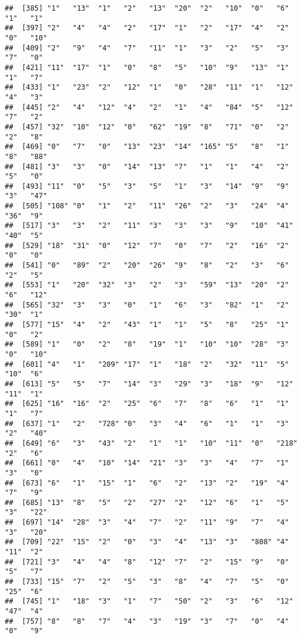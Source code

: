 \documentclass[
]{article}
\begin{document}
\begin{verbatim}
##  [385] "1"   "13"  "1"   "2"   "13"  "20"  "2"   "10"  "0"   "6"   "1"   "1"  
##  [397] "2"   "4"   "4"   "2"   "17"  "1"   "2"   "17"  "4"   "2"   "0"   "10" 
##  [409] "2"   "9"   "4"   "7"   "11"  "1"   "3"   "2"   "5"   "3"   "7"   "0"  
##  [421] "11"  "17"  "1"   "0"   "8"   "5"   "10"  "9"   "13"  "1"   "1"   "7"  
##  [433] "1"   "23"  "2"   "12"  "1"   "0"   "28"  "11"  "1"   "12"  "4"   "3"  
##  [445] "2"   "4"   "12"  "4"   "2"   "1"   "4"   "84"  "5"   "12"  "7"   "2"  
##  [457] "32"  "10"  "12"  "0"   "62"  "19"  "8"   "71"  "0"   "2"   "2"   "8"  
##  [469] "0"   "7"   "0"   "13"  "23"  "14"  "165" "5"   "8"   "1"   "8"   "88" 
##  [481] "3"   "3"   "0"   "14"  "13"  "7"   "1"   "1"   "4"   "2"   "5"   "0"  
##  [493] "11"  "0"   "5"   "3"   "5"   "1"   "3"   "14"  "9"   "9"   "3"   "47" 
##  [505] "108" "0"   "1"   "2"   "11"  "26"  "2"   "3"   "24"  "4"   "36"  "9"  
##  [517] "3"   "3"   "2"   "11"  "3"   "3"   "3"   "9"   "10"  "41"  "40"  "5"  
##  [529] "18"  "31"  "0"   "12"  "7"   "0"   "7"   "2"   "16"  "2"   "0"   "0"  
##  [541] "0"   "89"  "2"   "20"  "26"  "9"   "8"   "2"   "3"   "6"   "2"   "5"  
##  [553] "1"   "20"  "32"  "3"   "2"   "3"   "59"  "13"  "20"  "2"   "6"   "12" 
##  [565] "32"  "3"   "3"   "0"   "1"   "6"   "3"   "82"  "1"   "2"   "30"  "1"  
##  [577] "15"  "4"   "2"   "43"  "1"   "1"   "5"   "8"   "25"  "1"   "0"   "2"  
##  [589] "1"   "0"   "2"   "8"   "19"  "1"   "10"  "10"  "28"  "3"   "0"   "10" 
##  [601] "4"   "1"   "209" "17"  "1"   "18"  "2"   "32"  "11"  "5"   "10"  "6"  
##  [613] "5"   "5"   "7"   "14"  "3"   "29"  "3"   "18"  "9"   "12"  "11"  "1"  
##  [625] "16"  "16"  "2"   "25"  "6"   "7"   "8"   "6"   "1"   "1"   "1"   "7"  
##  [637] "1"   "2"   "728" "0"   "3"   "4"   "6"   "1"   "1"   "3"   "2"   "40" 
##  [649] "6"   "3"   "43"  "2"   "1"   "1"   "10"  "11"  "0"   "218" "2"   "6"  
##  [661] "0"   "4"   "10"  "14"  "21"  "3"   "3"   "4"   "7"   "1"   "3"   "0"  
##  [673] "6"   "1"   "15"  "1"   "6"   "2"   "13"  "2"   "19"  "4"   "7"   "9"  
##  [685] "13"  "8"   "5"   "2"   "27"  "2"   "12"  "6"   "1"   "5"   "3"   "22" 
##  [697] "14"  "28"  "3"   "4"   "7"   "2"   "11"  "9"   "7"   "4"   "3"   "20" 
##  [709] "22"  "15"  "2"   "0"   "3"   "4"   "13"  "3"   "808" "4"   "11"  "2"  
##  [721] "3"   "4"   "4"   "8"   "12"  "7"   "2"   "15"  "9"   "0"   "5"   "7"  
##  [733] "15"  "7"   "2"   "5"   "3"   "8"   "4"   "7"   "5"   "0"   "25"  "6"  
##  [745] "1"   "18"  "3"   "1"   "7"   "50"  "2"   "3"   "6"   "12"  "47"  "4"  
##  [757] "8"   "8"   "7"   "4"   "3"   "19"  "3"   "7"   "0"   "4"   "0"   "9"  

\end{verbatim}
\end{document}
